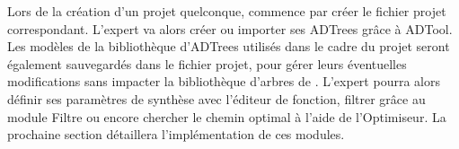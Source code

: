 Lors de la création d'un projet quelconque, \glasir{} commence par créer le fichier projet correspondant. L'expert va alors créer ou importer ses ADTrees grâce à ADTool. Les modèles de la bibliothèque d'ADTrees utilisés dans le cadre du projet seront également sauvegardés dans le fichier projet, pour gérer leurs éventuelles modifications sans impacter la bibliothèque d'arbres de \glasir{}. L'expert pourra alors définir ses paramètres de synthèse avec l'éditeur de fonction, filtrer grâce au module Filtre ou encore chercher le chemin optimal à l'aide de l'Optimiseur. La prochaine section détaillera l'implémentation de ces modules. 